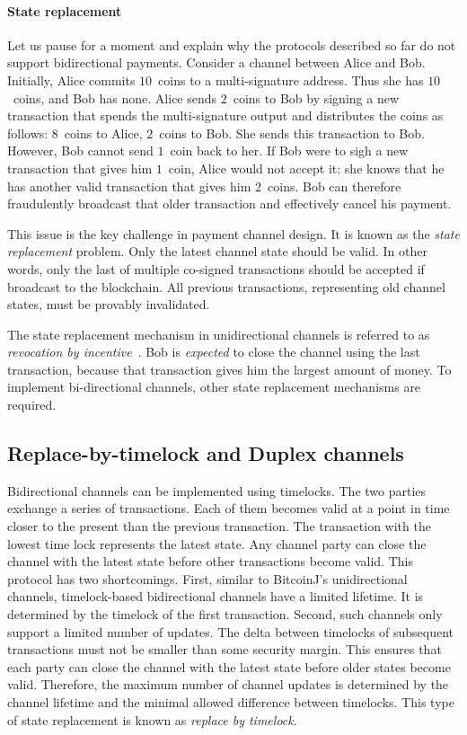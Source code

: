 \paragraph{State replacement}
Let us pause for a moment and explain why the protocols described so far do not support bidirectional payments.
Consider a channel between Alice and Bob.
Initially, Alice commits $10$~coins to a multi-signature address.
Thus she has $10$~coins, and Bob has none.
Alice sends $2$~coins to Bob by signing a new transaction that spends the multi-signature output and distributes the coins as follows: $8$~coins to Alice, $2$~coins to Bob.
She sends this transaction to Bob.
However, Bob cannot send $1$~coin back to her.
If Bob were to sigh a new transaction that gives him $1$~coin, Alice would not accept it: she knows that he has another valid transaction that gives him $2$~coins.
Bob can therefore fraudulently broadcast that older transaction and effectively cancel his payment.

This issue is the key challenge in payment channel design.
It is known as the \textit{state replacement} problem.
Only the latest channel state should be valid.
In other words, only the last of multiple co-signed transactions should be accepted if broadcast to the blockchain.
All previous transactions, representing old channel states, must be provably invalidated.

The state replacement mechanism in unidirectional channels is referred to as \textit{revocation by incentive}~\cite{Gudgeon2019}.
Bob is \textit{expected} to close the channel using the last transaction, because that transaction gives him the largest amount of money.
To implement bi-directional channels, other state replacement mechanisms are required.


\subsection{Replace-by-timelock and Duplex channels}

Bidirectional channels can be implemented using timelocks.
The two parties exchange a series of transactions.
Each of them becomes valid at a point in time closer to the present than the previous transaction.
The transaction with the lowest time lock represents the latest state.
Any channel party can close the channel with the latest state before other transactions become valid.
This protocol has two shortcomings.
First, similar to BitcoinJ's unidirectional channels, timelock-based bidirectional channels have a limited lifetime.
It is determined by the timelock of the first transaction.
Second, such channels only support a limited number of updates.
The delta between timelocks of subsequent transactions must not be smaller than some security margin.
This ensures that each party can close the channel with the latest state before older states become valid.
Therefore, the maximum number of channel updates is determined by the channel lifetime and the minimal allowed difference between timelocks.
This type of state replacement is known as \textit{replace by timelock}.


